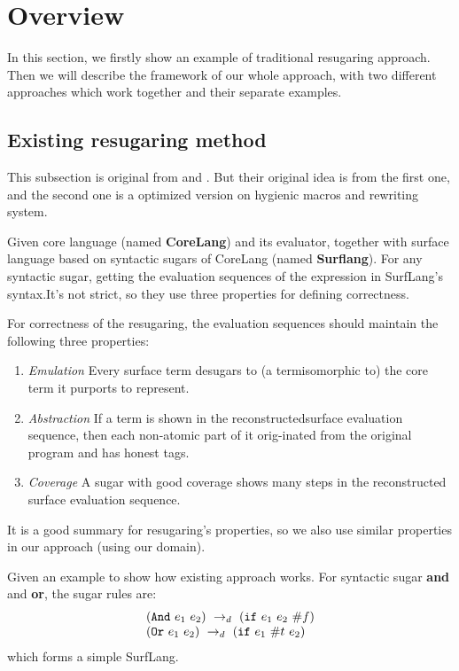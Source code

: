 \section{Overview}
\label{sec2}

In this section, we firstly show an example of traditional resugaring approach. Then we will describe the framework of our whole approach, with two different approaches which work together and their separate examples.
\subsection{Existing resugaring method}
This subsection is original from \cite{resugaring} and \cite{hygienic}. But their original idea is from the first one, and the second one is a optimized version on hygienic macros and rewriting system.
\begin{Def}[Resugaring]
Given core language (named {\bfseries CoreLang}) and its evaluator, together with surface language based on syntactic sugars of CoreLang (named {\bfseries Surflang}). For any syntactic sugar, getting the evaluation sequences of the expression in SurfLang's syntax.It's not strict, so they use three properties for defining correctness.
\end{Def}
For correctness of the resugaring, the evaluation sequences should maintain the following three properties:
\begin{enumerate}
\item \emph{Emulation} Every surface term desugars to (a termisomorphic to) the core term it purports to represent.
\item \emph{Abstraction} If a term is shown in the reconstructedsurface evaluation sequence, then each non-atomic part of it orig-inated from the original program and has honest tags.
\item \emph{Coverage}  A sugar with good coverage shows many steps in the reconstructed surface evaluation sequence.
\end{enumerate}
It is a good summary for resugaring's properties, so we also use similar properties in our approach (using our domain).

Given an example to show how existing approach works. For syntactic sugar {\bfseries and} and {\bfseries or}, the sugar rules are:
\[
\begin{array}{l}
(\mbox{\tt And}~e_1~e_2) ~\rightarrow_d~ (\mbox{\tt if}~e_1~e_2~\#f)\\
(\mbox{\tt Or}~e_1~e_2) ~\rightarrow_d~ (\mbox{\tt if}~e_1~\#t~e_2)
\end{array}
\]
which forms a simple SurfLang.

